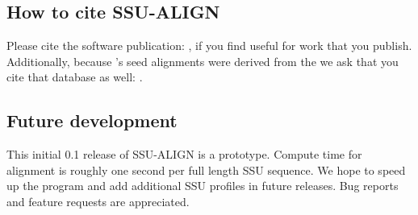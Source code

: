 \subsection{How to cite SSU-ALIGN}

Please cite the  software publication:
\cite{Nawrocki09}, if you find  useful for work that
you publish. Additionally, because 's seed alignments were
derived from the  we ask that you cite
that database as well: \cite{CannoneGutell02}. 

\subsection{Future development}

This initial 0.1 release of \textsc{SSU-ALIGN} is a prototype. 
Compute time for alignment is roughly one second per full length SSU
sequence. We hope to speed up the program and add additional SSU
profiles in future releases. Bug reports and feature requests are
appreciated.
